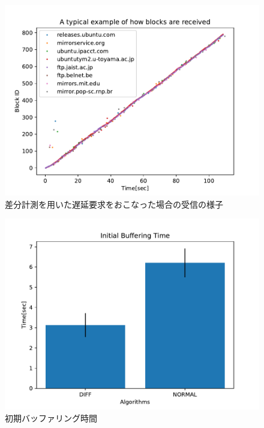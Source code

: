 \documentclass[a4j,12pt]{gradthesis_utf8}
\begin{document}
\begin{figure}[ht]
	\begin{center}
		\includegraphics[width=11.9cm]{figure/TypicalPlotDelay=DIFFInit=TrueDup=IBRC.pdf}
		\caption{差分計測を用いた遅延要求をおこなった場合の受信の様子}
		\label{tpddpub}
	\end{center}
\end{figure}

\newpage

\begin{figure}[ht]
	\begin{center}
		\includegraphics[width=12.125cm]{figure/InitialBufferingTimePub.pdf}
		\caption{初期バッファリング時間}
		\label{ibtpub}
	\end{center}
\end{figure}
\end{document}
